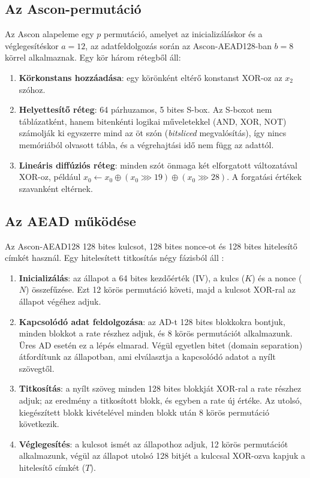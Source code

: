 \documentclass[a4paper,12pt]{report}
\theoremstyle{definition}
\theoremstyle{remark}
\begin{document}
\subsection{Az Ascon-permutáció}\label{sec:ascon_perm}

Az Ascon alapeleme egy $p$ permutáció, amelyet az inicializáláskor és a véglegesítéskor $a = 12$, az adatfeldolgozás során az Ascon-AEAD128-ban $b = 8$ körrel alkalmaznak. Egy kör három rétegből áll:

\begin{enumerate}
	\item \textbf{Körkonstans hozzáadása}: egy körönként eltérő konstanst XOR-oz az $x_2$ szóhoz.
	\item \textbf{Helyettesítő réteg}: 64 párhuzamos, 5 bites S-box. Az S-boxot nem táblázatként, hanem bitenkénti logikai műveletekkel (AND, XOR, NOT) számolják ki egyszerre mind az öt szón (\emph{bitsliced} megvalósítás), így nincs memóriából olvasott tábla, és a végrehajtási idő nem függ az adattól.
	\item \textbf{Lineáris diffúziós réteg}: minden szót önmaga két elforgatott változatával XOR-oz, például $x_0 \leftarrow x_0 \oplus (x_0 \ggg 19) \oplus (x_0 \ggg 28)$. A forgatási értékek szavanként eltérnek.
\end{enumerate}

\subsection{Az AEAD működése}\label{sec:ascon_aead}

Az Ascon-AEAD128 128 bites kulcsot, 128 bites nonce-ot és 128 bites hitelesítő címkét használ. Egy hitelesített titkosítás négy fázisból áll \cite{Dobraunig2021,NISTSP800232}:

\begin{enumerate}
	\item \textbf{Inicializálás}: az állapot a 64 bites kezdőérték (IV), a kulcs ($K$) és a nonce ($N$) összefűzése. Ezt 12 körös permutáció követi, majd a kulcsot XOR-ral az állapot végéhez adjuk.
	\item \textbf{Kapcsolódó adat feldolgozása}: az AD-t 128 bites blokkokra bontjuk, minden blokkot a rate részhez adjuk, és 8 körös permutációt alkalmazunk. Üres AD esetén ez a lépés elmarad. Végül egyetlen bitet (domain separation) átfordítunk az állapotban, ami elválasztja a kapcsolódó adatot a nyílt szövegtől.
	\item \textbf{Titkosítás}: a nyílt szöveg minden 128 bites blokkját XOR-ral a rate részhez adjuk; az eredmény a titkosított blokk, és egyben a rate új értéke. Az utolsó, kiegészített blokk kivételével minden blokk után 8 körös permutáció következik.
	\item \textbf{Véglegesítés}: a kulcsot ismét az állapothoz adjuk, 12 körös permutációt alkalmazunk, végül az állapot utolsó 128 bitjét a kulccsal XOR-ozva kapjuk a hitelesítő címkét ($T$).
\end{enumerate}
\end{document}
